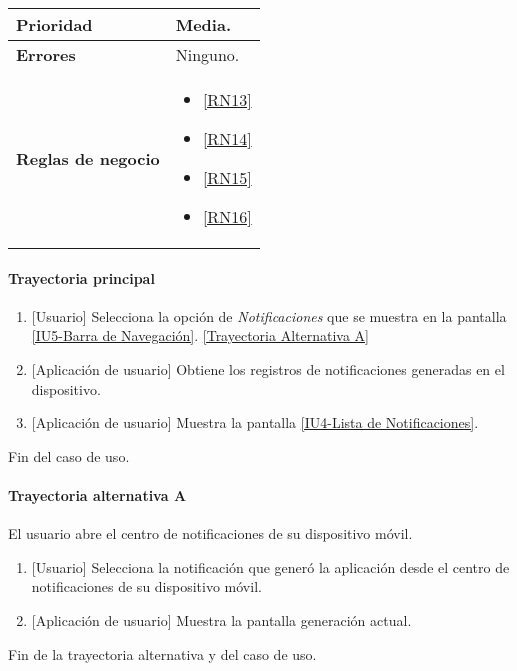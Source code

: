 \begin{longtable}{|J{5cm}|J{10.3cm}|}
		\\ \hline 
	\textbf{Prioridad} & 
		Media. \\ \hline
	\textbf{Errores} & Ninguno. 
		\\ \hline
	\textbf{Reglas de negocio} & 
		\begin{itemize}
		 	\item \ref{RN13}
		 	\item \ref{RN14}
		 	\item \ref{RN15}
		 	\item \ref{RN16}
		\end{itemize}
		 \\ \hline
\end{longtable}

\paragraph{Trayectoria principal} \label{SUB-U-CU1.6:TP}
	\begin{enumerate}
		\item {[Usuario]} Selecciona la opción de \textit{Notificaciones} que se muestra en la pantalla  \hyperref[fig:Barra de navegacion]{[IU5-Barra de Navegación]}. \hyperref[SUB-U-CU1.6:TA]{[Trayectoria Alternativa A]}
		\item {[Aplicación de usuario]} Obtiene los registros de notificaciones generadas en el dispositivo.
		\item {[Aplicación de usuario]} Muestra la pantalla \hyperref[fig:Lista de Notificaciones]{[IU4-Lista de Notificaciones]}.
	\end{enumerate}
	Fin del caso de uso.

\paragraph{Trayectoria alternativa A} \label{SUB-U-CU1.6:TA}
 	El usuario abre el centro de notificaciones de su dispositivo móvil.
 	\begin{enumerate}[label=A\arabic*.]
 	    \item {[Usuario]} Selecciona la notificación que generó la aplicación desde el centro de notificaciones de su dispositivo móvil.
 	    \item {[Aplicación de usuario]} Muestra la pantalla generación actual.
 	\end{enumerate}
 	Fin de la trayectoria alternativa y del caso de uso.